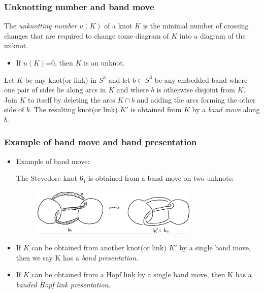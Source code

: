 \documentclass{beamer}
\theoremstyle{ex}
\theoremstyle{rem}
\begin{document}
\begin{frame}
	\frametitle{Unknotting number and band move}
	\begin{definition}
		The \textit{unknotting number} $u(K)$ of a knot $K$ is the minimal number of crossing changes that are required to change some diagram of $K$ into a diagram of the unknot.
	\end{definition}
	\begin{itemize}
		\item If $u(K)$=0, then $K$ is an unknot.
	\end{itemize}
	\begin{definition}
		Let $K$ be any knot(or link) in $S^3$ and let $b \subset S^3$ be any embedded band where one pair of sides lie along arcs in $K$ and where $b$ is otherwise disjoint from $K$. Join $K$ to itself by deleting the arcs $K \cap b$ and adding the arcs forming the other side of $b$. The resulting knot(or link) $K'$ is obtained from $K$ by a \textit{band move} along $b$.
	\end{definition}
\end{frame}

\begin{frame}
	\frametitle{Example of band move and band presentation}
	\begin{itemize}
		\item Example of band move:
		
		The Stevedore knot $6_1$ is obtained from a band move on two unknots:
		\begin{figure}
			\hspace*{-1.5cm}\begin{center}{\includegraphics [width=8cm] {bandmove}}\end{center}
		\end{figure}
	\end{itemize}
	\begin{itemize}
		\item If $K$ can be obtained from another knot(or link) $K'$ by a single band move, then we say K has a \textit{band presentation}.
	\end{itemize}
	\begin{itemize}
		\item If $K$ can be obtained from a Hopf link by a single band move, then K has a \textit{banded Hopf link presentation}.
	\end{itemize}
\end{frame}
\end{document}
